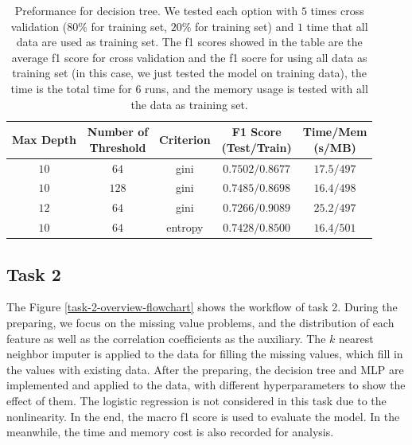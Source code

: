 \documentclass[11pt]{article}
\begin{document}
\begin{table}[H]
  \centering
  \begin{tabular}{|c|c|c|c|c|}
    \hline
    Max Depth & \makecell{Number of                                          \\ Threshold} & Criterion & \makecell{F1 Score \\ (Test/Train)} & \makecell{Time/Mem \\ (s/MB)}               \\
    \hline
    $10$      & $64$                & gini    & $0.7502/0.8677$ & $17.5/497$ \\
    \hline
    $10$      & $128$               & gini    & $0.7485/0.8698$ & $16.4/498$ \\
    \hline
    $12$      & $64$                & gini    & $0.7266/0.9089$ & $25.2/497$ \\
    \hline
    $10$      & $64$                & entropy & $0.7428/0.8500$ & $16.4/501$ \\
    \hline
  \end{tabular}
  \caption{Preformance for decision tree. We tested each option with $5$ times cross validation ($80\%$ for training set, $20\%$ for training set) and $1$ time that all data are used as training set. The f1 scores showed in the table are the average f1 score for cross validation and the f1 socre for using all data as training set (in this case, we just tested the model on training data), the time is the total time for $6$ runs, and the memory usage is tested with all the data as training set.}
  \label{task-1-result-2}
\end{table}

\subsection{Task 2}

The Figure \ref{task-2-overview-flowchart} shows the workflow of task 2. During the preparing, we focus on the missing  value problems, and the distribution of each feature as well as the correlation coefficients as the auxiliary. The $k$ nearest neighbor imputer is applied to the data for filling the missing values, which fill in the values with existing data. After the preparing, the decision tree and MLP are implemented and applied to the data, with different hyperparameters to show the effect of them. The logistic regression is not considered in this task due to the nonlinearity. In the end, the macro f1 score is used to evaluate the model. In the meanwhile, the time and memory cost is also recorded for analysis.
\end{document}
